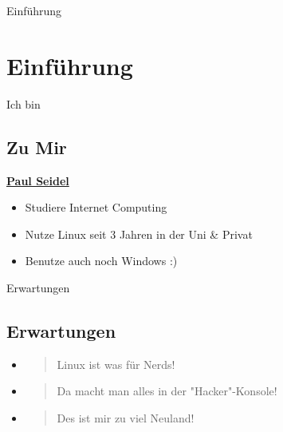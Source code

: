 
\begin{frame}{Einführung}
    \section{Einführung}\label{sec:einfuhrung}

\end{frame}

\begin{frame}{Ich bin}
    \subsection{Zu Mir}\label{sec:Zu Mir}

    \underline{\textbf{Paul Seidel}}

    \begin{itemize}
        \item Studiere Internet Computing
        \item Nutze Linux seit 3 Jahren in der Uni \& Privat
        \item Benutze auch noch Windows :)
    \end{itemize}

\end{frame}

\begin{frame}{Erwartungen}
    \subsection{Erwartungen}\label{subsec:erwartungen}

    \begin{itemize}
        \item \begin{quote}
                  Linux ist was für Nerds!
        \end{quote}
        \item \begin{quote}
                  Da macht man alles in der "Hacker"-Konsole!
        \end{quote}
        \item \begin{quote}
                  Des ist mir zu viel Neuland!
        \end{quote}
    \end{itemize}

\end{frame}

